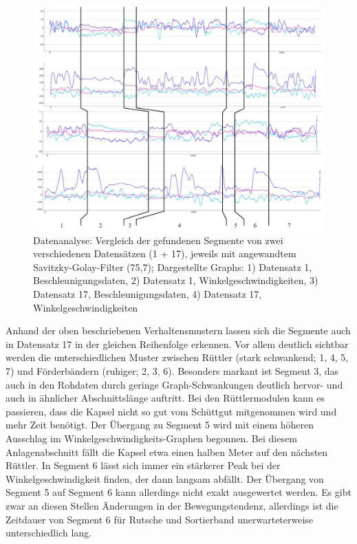 \begin{figure}[htb]
	\centering
	\includegraphics[width=1\linewidth]{images/k5-segmente_vergleich.JPG}
	\caption{Datenanalyse: Vergleich der gefundenen Segmente von zwei verschiedenen Datensätzen (1 + 17), jeweils mit angewandtem Savitzky-Golay-Filter (75,7); Dargestellte Graphs: 1) Datensatz 1, Beschleunigungsdaten, 2) Datensatz 1, Winkelgeschwindigkeiten, 3) Datensatz 17, Beschleunigungsdaten, 4) Datensatz 17, Winkelgeschwindigkeiten}
	\label{fig:k5_segmente_vergleich}
\end{figure}

Anhand der oben beschriebenen Verhaltensmustern lassen sich die Segmente auch in Datensatz 17 in der gleichen Reihenfolge erkennen. Vor allem deutlich sichtbar werden die unterschiedlichen Muster zwischen Rüttler (stark schwankend; 1, 4, 5, 7) und Förderbändern (ruhiger; 2, 3, 6). Besonders markant ist Segment 3, das auch in den Rohdaten durch geringe Graph-Schwankungen deutlich hervor- und auch in ähnlicher Abschnittslänge auftritt. Bei den Rüttlermodulen kann es passieren, dass die Kapsel nicht so gut vom Schüttgut mitgenommen wird und mehr Zeit benötigt. Der Übergang zu Segment 5 wird mit einem höheren Ausschlag im Winkelgeschwindigkeits-Graphen begonnen. Bei diesem Anlagenabschnitt fällt die Kapsel etwa einen halben Meter auf den nächsten Rüttler. In Segment 6 lässt sich immer ein stärkerer Peak bei der Winkelgeschwindigkeit finden, der dann langsam abfällt.
Der Übergang von Segment 5 auf Segment 6 kann allerdings nicht exakt ausgewertet werden. Es gibt zwar an diesen Stellen Änderungen in der Bewegungstendenz, allerdings ist die Zeitdauer von Segment 6 für Rutsche und Sortierband unerwarteterweise unterschiedlich lang. 

